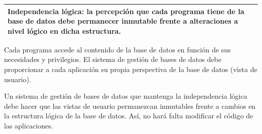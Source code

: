 \documentclass[10pt,a4paper,spanish]{report}
\begin{document}
\begin{center}
\begin{tabular}{|p{12cm}|}
\hline
\textcolor[rgb]{1,0.2,0.3}{\textbf{Independencia lógica}}: la percepción que cada programa tiene de la base de datos debe permanecer inmutable frente a alteraciones a nivel lógico en dicha estructura. \\
\hline
\end{tabular}
\end{center}

Cada programa accede al contenido de la base de datos en función de sus necesidades y privilegios. El sistema de gestión de bases de datos debe proporcionar a cada aplicación su propia perspectiva de la base de datos (vista de usuario).

Un sistema de gestión de bases de datos que mantenga la independencia lógica debe hacer que las vistas de usuario permanezcan inmutables frente a cambios en la estructura lógica de la base de datos. Así, no hará falta modificar el código de las aplicaciones.
\end{document}
